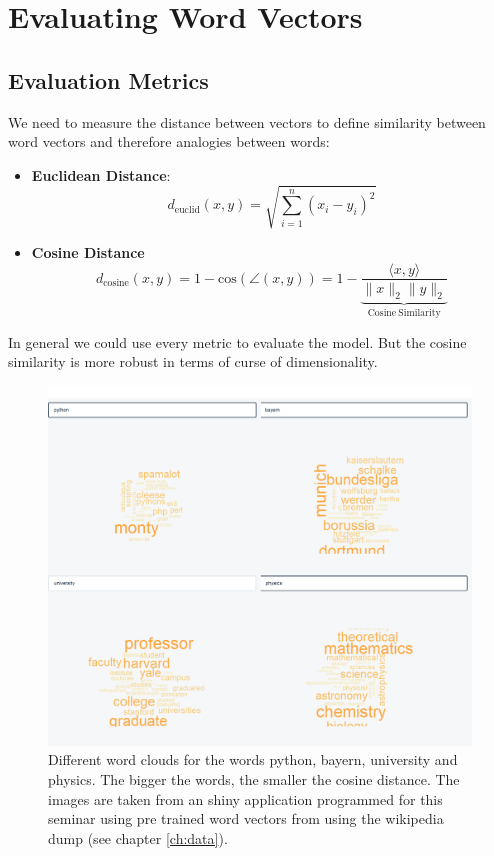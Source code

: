 \chapter{Evaluating Word Vectors}\label{ch:eval}

\section{Evaluation Metrics}

We need to measure the distance between vectors to define similarity between word vectors and therefore analogies between words:

\begin{itemize}
  \item 
    \textbf{Euclidean Distance}: 
    \[
      d_\mathrm{euclid}(x,y) = \sqrt{\sum\limits_{i=1}^n(x_i - y_i)^2}
    \]

  \item 
    \textbf{Cosine Distance}
    \[
      d_\mathrm{cosine}(x,y) = 1 - \mathrm{cos}(\angle (x, y)) = 
      1 - \underbrace{\frac{\langle x,y\rangle}{\|x\|_2\|y\|_2}}_{\mathrm{Cosine\ Similarity}}
    \]
\end{itemize}

In general we could use every metric to evaluate the model. But the 
cosine similarity is more robust in terms of curse of dimensionality.

\begin{figure}[!h]
\centering
\includegraphics[scale=0.5]{images/word_clouds.png} 
\caption[Different word clouds illustrating similarities.]{Different word clouds for the words python, bayern, university and physics. The bigger the words, the smaller the cosine distance. The images are taken from an shiny application programmed for this seminar using pre trained word vectors from \cite{pennington2014glove} using the wikipedia dump (see chapter \ref{ch:data}).}
\label{fig:wc}
\end{figure}

